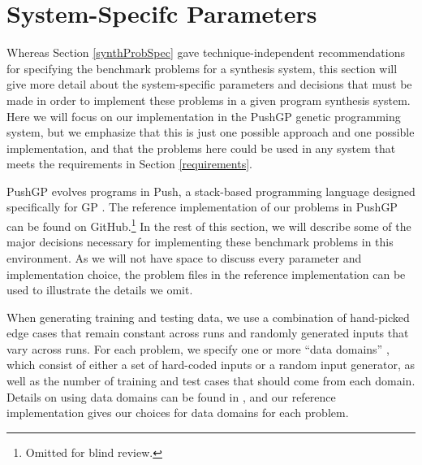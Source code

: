 \documentclass{sig-alternate}
\begin{document}
\section{System-Specifc Parameters} \label{systemParamsSection}

Whereas Section \ref{synthProbSpec} gave technique-independent recommendations for specifying the benchmark problems for a synthesis system, this section will give more detail about the system-specific parameters and decisions that must be made in order to implement these problems in a given program synthesis system. Here we will focus on our implementation in the PushGP genetic programming system, but we emphasize that this is just one possible approach and one possible implementation, and that the problems here could be used in any system that meets the requirements in Section \ref{requirements}.


PushGP evolves programs in Push, a stack-based programming language designed specifically for GP \cite{spector:2002:GPEM, 1068292}. %
The reference implementation of our problems in PushGP can be found on GitHub.\footnote{Omitted for blind review.} In the rest of this section, we will describe some of the major decisions necessary for implementing these benchmark problems in this environment. As we will not have space to discuss every parameter and implementation choice, the problem files in the reference implementation can be used to illustrate the details we omit.

When generating training and testing data, we use a combination of hand-picked edge cases that remain constant across runs and randomly generated inputs that vary across runs. For each problem, we specify one or more ``data domains'' \cite{Helmuth:2014:GECCO}, which consist of either a set of hard-coded inputs or a random input generator, as well as the number of training and test cases that should come from each domain. Details on using data domains can be found in \cite{Helmuth:2014:GECCO}, and our reference implementation gives our choices for data domains for each problem.
\end{document}
